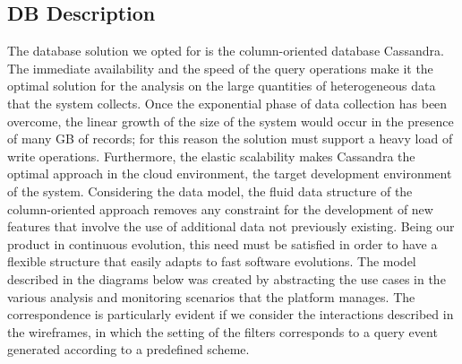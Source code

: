 \documentclass[../main.tex]{subfiles}
\begin{document}
    \subsection{DB Description}
    The database solution we opted for is the column-oriented database Cassandra.
    The immediate availability and the speed of the query operations make it the optimal solution for the analysis on the large quantities of heterogeneous data that the system collects. Once the exponential phase of data collection has been overcome, the linear growth of the size of the system would occur in the presence of many GB of records; for this reason the solution must support a heavy load of write operations. Furthermore, the elastic scalability makes Cassandra the optimal approach in the cloud environment, the target development environment of the system. Considering the data model, the fluid data structure of the column-oriented approach removes any constraint for the development of new features that involve the use of additional data not previously existing. Being our product in continuous evolution, this need must be satisfied in order to have a flexible structure that easily adapts to fast software evolutions.
    The model described in the diagrams below was created by abstracting the use cases in the various analysis and monitoring scenarios that the platform manages. The correspondence is particularly evident if we consider the interactions described in the wireframes, in which the setting of the filters corresponds to a query event generated according to a predefined scheme.
\end{document}
